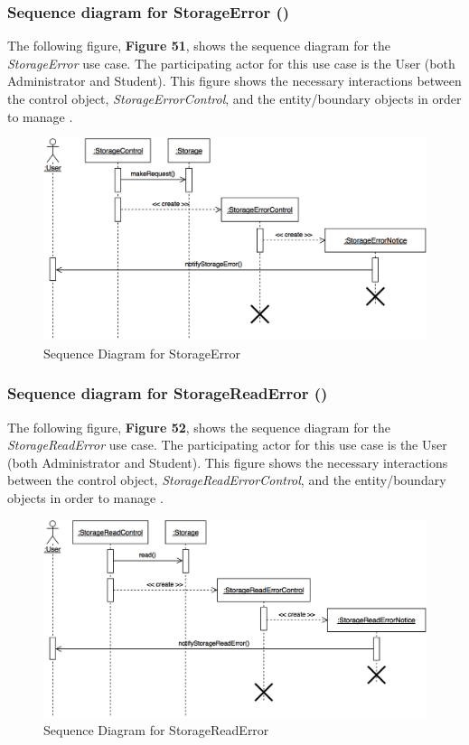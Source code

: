 \documentclass[12pt,letterpaper]{article}
\begin{document}
\subsubsection*{Sequence diagram for StorageError (\storageerror{})}

The following figure, {\bf Figure 51}, shows the sequence diagram for the {\it StorageError} use case. The participating actor for this use case is
the User (both Administrator and Student). This figure shows the necessary interactions between the control object, {\it StorageErrorControl}, and the
entity/boundary objects in order to manage \storageerror{}.

\begin{figure}[H]
	\centering{}
	\includegraphics[scale=0.3]{imgs/seq/storage-error.png}
	\caption{Sequence Diagram for StorageError}
\end{figure}

\subsubsection*{Sequence diagram for StorageReadError (\storagereaderror{})}

The following figure, {\bf Figure 52}, shows the sequence diagram for the {\it StorageReadError} use case. The participating actor for this use case is
the User (both Administrator and Student). This figure shows the necessary interactions between the control object, {\it StorageReadErrorControl}, and the
entity/boundary objects in order to manage \storagereaderror{}.

\begin{figure}[H]
	\centering{}
	\includegraphics[scale=0.3]{imgs/seq/storage-read-error.png}
	\caption{Sequence Diagram for StorageReadError}
\end{figure}
\end{document}
